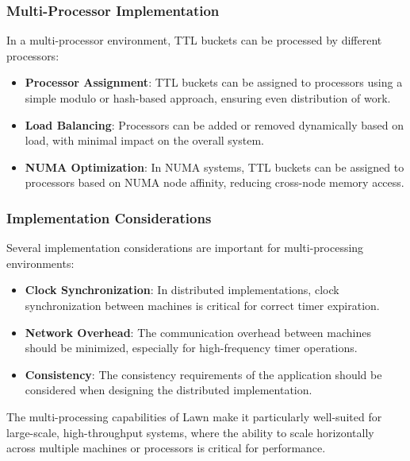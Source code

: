 \documentclass[conference]{IEEEtran}
\begin{document}
\subsubsection{Multi-Processor Implementation}
In a multi-processor environment, TTL buckets can be processed by different processors:

\begin{itemize}
    \item \textbf{Processor Assignment}: TTL buckets can be assigned to processors using a simple modulo or hash-based approach, ensuring even distribution of work.
    
    \item \textbf{Load Balancing}: Processors can be added or removed dynamically based on load, with minimal impact on the overall system.
    
    \item \textbf{NUMA Optimization}: In NUMA systems, TTL buckets can be assigned to processors based on NUMA node affinity, reducing cross-node memory access.
\end{itemize}

\subsubsection{Implementation Considerations}
Several implementation considerations are important for multi-processing environments:

\begin{itemize}
    \item \textbf{Clock Synchronization}: In distributed implementations, clock synchronization between machines is critical for correct timer expiration.
    
    \item \textbf{Network Overhead}: The communication overhead between machines should be minimized, especially for high-frequency timer operations.
    
    \item \textbf{Consistency}: The consistency requirements of the application should be considered when designing the distributed implementation.
\end{itemize}

The multi-processing capabilities of Lawn make it particularly well-suited for large-scale, high-throughput systems, where the ability to scale horizontally across multiple machines or processors is critical for performance.
\end{document}
